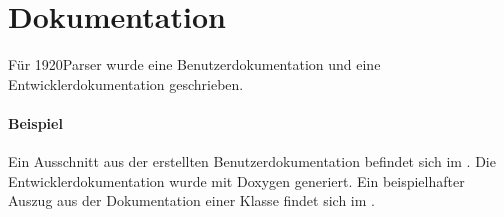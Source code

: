 \section{Dokumentation}
\label{sec:Dokumentation}
Für 1920Parser wurde eine Benutzerdokumentation und eine Entwicklerdokumentation geschrieben.

\paragraph{Beispiel}
Ein Ausschnitt aus der erstellten Benutzerdokumentation befindet sich im .
Die Entwicklerdokumentation wurde mit Doxygen generiert. Ein beispielhafter Auszug aus der Dokumentation einer Klasse findet sich im . 

